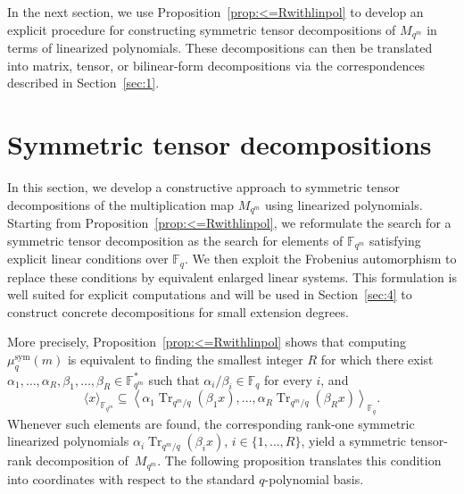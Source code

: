 \documentclass[11pt,a4paper,reqno]{article}
\numberwithin{equation}{section}
\theoremstyle{definition}
\begin{document}
In the next section, we use Proposition~\ref{prop:<=Rwithlinpol} to develop an explicit procedure for
constructing symmetric tensor decompositions of \(M_{q^m}\) in terms of linearized polynomials. These decompositions can then be translated into matrix, tensor, or bilinear-form decompositions via the correspondences described in Section~\ref{sec:1}.

\section{Symmetric tensor decompositions}\label{sec:symdec}

In this section, we develop a constructive approach to symmetric tensor
decompositions of the multiplication map \(M_{q^m}\) using linearized
polynomials. Starting from Proposition~\ref{prop:<=Rwithlinpol},  we reformulate the search for
a symmetric tensor decomposition as the search for elements of
\(\mathbb F_{q^m}\) satisfying explicit linear conditions over \(\mathbb F_q\). We then exploit the Frobenius automorphism to replace these conditions by equivalent enlarged linear systems. This formulation is well suited for
explicit computations and will be used in Section~\ref{sec:4} to construct concrete decompositions for small extension degrees.

More precisely, Proposition~\ref{prop:<=Rwithlinpol} shows that computing
\(\mu_q^{\mathrm{sym}}(m)\) is equivalent to finding the smallest integer \(R\)
for which there exist $\alpha_1,\ldots,\alpha_R,\beta_1,\ldots,\beta_R\in\mathbb F_{q^m}^{*}$ such that \(\alpha_i/\beta_i\in\mathbb F_q\) for every \(i\), and
\[
\langle x\rangle_{\mathbb F_{q^m}}
\subseteq
\left\langle
\alpha_1\operatorname{Tr}_{q^m/q}(\beta_1x),\ldots,
\alpha_R\operatorname{Tr}_{q^m/q}(\beta_Rx)
\right\rangle_{\mathbb F_q}.
\]
Whenever such elements are found, the corresponding rank-one symmetric
linearized polynomials $\alpha_i\operatorname{Tr}_{q^m/q}(\beta_i x)$, $i\in\{1,\ldots,R\}$, yield a symmetric tensor-rank decomposition of~\(M_{q^m}\). The following proposition translates this condition into coordinates with respect to the standard \(q\)-polynomial basis.
\end{document}

